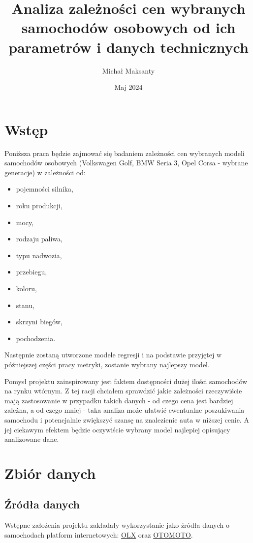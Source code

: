 \documentclass{article}
\title{Analiza zależności cen wybranych samochodów osobowych od ich parametrów i danych technicznych}
\author{Michał Maksanty}
\date{Maj 2024}
\begin{document}
\maketitle
\tableofcontents

\newpage

\section{Wstęp}
Poniższa praca będzie zajmować się badaniem zależności cen wybranych modeli samochodów osobowych (Volkswagen Golf, BMW Seria 3, Opel Corsa - wybrane generacje) w zależności od:
\begin{itemize}[itemsep=0mm]
    \item pojemności silnika,
    \item roku produkcji,
    \item mocy,
    \item rodzaju paliwa,
    \item typu nadwozia,
    \item przebiegu,
    \item koloru,
    \item stanu,
    \item skrzyni biegów,
    \item pochodzenia.
\end{itemize}
Następnie zostaną utworzone modele regresji i na podstawie przyjętej w późniejszej części pracy metryki, zostanie wybrany najlepszy model.

Pomysł projektu zainspirowany jest faktem dostępności dużej ilości samochodów na rynku wtórnym. Z tej racji chciałem sprawdzić jakie zależności rzeczywiście mają zastosowanie w przypadku takich danych - od czego cena jest bardziej zależna, a od czego mniej - taka analiza może ułatwić ewentualne poszukiwania samochodu i potencjalnie zwiększyć szansę na znalezienie auta w niższej cenie. A jej ciekawym efektem będzie oczywiście wybrany model najlepiej opisujący analizowane dane.

\section{Zbiór danych}
\subsection{Źródła danych}
Wstępne założenia projektu zakładały wykorzystanie jako źródła danych o samochodach platform internetowych: \href{https://www.olx.pl/}{OLX} oraz \href{https://www.otomoto.pl/}{OTOMOTO}.
\end{document}
